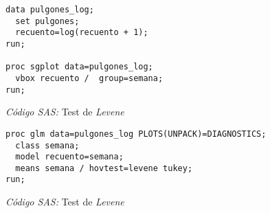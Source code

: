 \documentclass[11pt]{article}
\begin{document}
    \begin{figure}[!h]
      \centering
      \begin{verbatim}
data pulgones_log;
  set pulgones;
  recuento=log(recuento + 1);
run;

proc sgplot data=pulgones_log;
  vbox recuento /  group=semana;
run;
      \end{verbatim}
      \caption{\emph{Código SAS:} Test de \emph{Levene}}
      \label{code:sas_7}
    \end{figure}

    \begin{figure}[!h]
      \centering
      \begin{verbatim}
proc glm data=pulgones_log PLOTS(UNPACK)=DIAGNOSTICS;
  class semana;
  model recuento=semana;
  means semana / hovtest=levene tukey;
run;
      \end{verbatim}
      \caption{\emph{Código SAS:} Test de \emph{Levene}}
      \label{code:sas_8}
    \end{figure}


    \nocite{rano2017}

    
    
\end{document}

